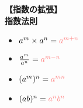 \documentclass{article}
\begin{document}
\textbf{【指数の拡張】}\\
\textbf{指数法則}
\begin{itemize}
        \item \(a^m \times a^n = \textcolor[rgb]{1,0.5,0.5}{a^{m + n}}\)
        \item \(\frac{a^m}{a^n} = \textcolor[rgb]{1,0.5,0.5}{a^{m - n}}\)
        \item \( (a^m)^n = \textcolor[rgb]{1,0.5,0.5}{a^{mn}}\)
        \item \( (ab)^n = \textcolor[rgb]{1,0.5,0.5}{a^nb^n}\)
\end{itemize}
\end{document}
